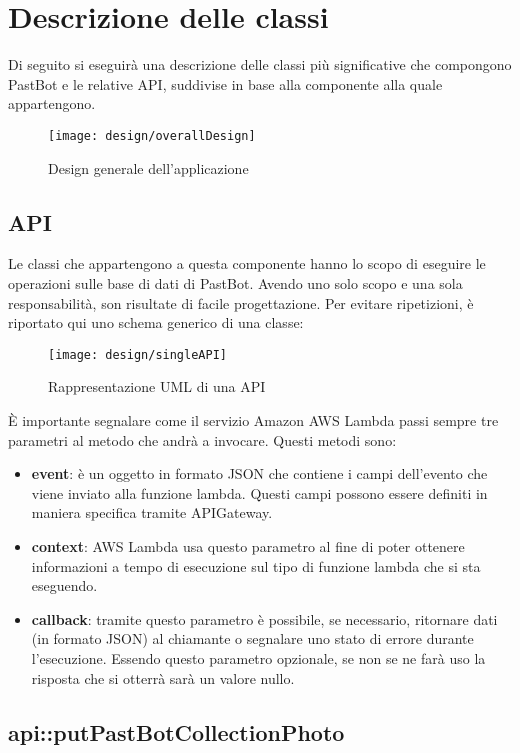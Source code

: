 \section{Descrizione delle classi}
Di seguito si eseguirà una descrizione delle classi più significative che
compongono PastBot e le relative API, suddivise in base alla componente alla
quale appartengono.

\begin{figure}[H]
  \centering
  \texttt{[image: design/overallDesign]}
  \caption{Design generale dell'applicazione}
\end{figure}

\subsection{API}

Le classi che appartengono a questa componente hanno lo scopo di eseguire le
operazioni sulle base di dati di PastBot. Avendo uno solo scopo e una sola
responsabilità, son risultate di facile progettazione.
Per evitare ripetizioni, è riportato qui uno schema generico di una classe:

\begin{figure}[H]
  \centering
  \texttt{[image: design/singleAPI]}
  \caption{Rappresentazione UML di una API}
\end{figure}

\label{design:api:params}
È importante segnalare come il servizio Amazon AWS Lambda passi sempre tre
parametri al metodo che andrà a invocare. Questi metodi sono:
\begin{itemize}
  \item \textbf{event}: è un oggetto in formato JSON che contiene i campi
dell'evento che viene inviato alla funzione lambda. Questi campi possono essere
definiti in maniera specifica tramite APIGateway.
  \item \textbf{context}: AWS Lambda usa questo parametro al fine di poter
ottenere informazioni a tempo di esecuzione sul tipo di funzione lambda che si
sta eseguendo.
  \item \textbf{callback}: tramite questo parametro è possibile, se necessario,
ritornare dati (in formato JSON) al chiamante o segnalare uno stato di errore
durante l'esecuzione. Essendo questo parametro opzionale, se non se ne farà uso
la risposta che si otterrà sarà un valore nullo.
\end{itemize}

\subsection{api::putPastBotCollectionPhoto}

